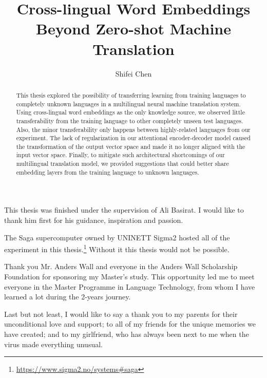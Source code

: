 \documentclass[thesis,fonts=libertine]{cluu}
\begin{document}
\author{Shifei Chen}
\title{Cross-lingual Word Embeddings Beyond Zero-shot Machine Translation}

\maketitle

\begin{abstract}
  This thesis explored the possibility of transferring learning from training languages to completely unknown languages in a multilingual neural machine translation system. Using cross-lingual word embeddings as the only knowledge source, we observed little transferability from the training language to other completely unseen test languages. Also, the minor transferability only happens between highly-related languages from our experiment. The lack of regularization in our attentional encoder-decoder model caused the transformation of the output vector space and made it no longer aligned with the input vector space. Finally, to mitigate such architectural shortcomings of our multilingual translation model, we provided suggestions that could better share embedding layers from the training language to unknown languages.
\end{abstract}

\tableofcontents


This thesis was finished under the supervision of Ali Basirat. I would like 
to thank him first for his guidance, inspiration and passion.

The Saga supercomputer owned by UNINETT Sigma2 hosted all of the experiment in this thesis.\footnote{\url{https://www.sigma2.no/systems\#saga}} Without it this thesis would not be possible.

Thank you Mr. Anders Wall and everyone in the Anders Wall Scholarship Foundation for sponsoring my Master's study. This opportunity led me to meet everyone in the Master Programme in Language Technology, from whom I have learned a lot during the 2-years journey.

Last but not least, I would like to say a thank you to my parents for their unconditional love and support; to all of my friends for the unique memories we have created; and to my girlfriend, who has always been next to me when the virus made everything unusual.

\end{document}
